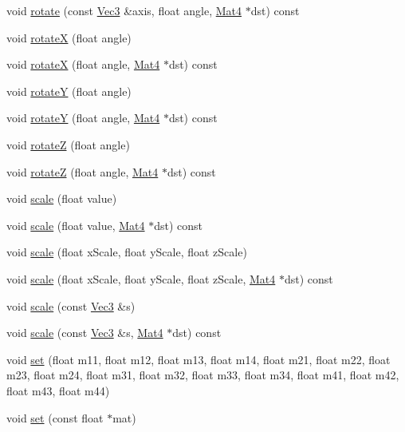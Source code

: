 \begin{DoxyCompactItemize}
\item 
void \hyperlink{classMat4_a548095c5ec16649ab859f317c5b6fec8}{rotate} (const \hyperlink{classVec3}{Vec3} \&axis, float angle, \hyperlink{classMat4}{Mat4} $\ast$dst) const
\item 
void \hyperlink{classMat4_a5e84d2bcffe8021db81c6614a88b39e5}{rotateX} (float angle)
\item 
void \hyperlink{classMat4_a8fd010ff0b011e0e2b9f97e1b83df9e5}{rotateX} (float angle, \hyperlink{classMat4}{Mat4} $\ast$dst) const
\item 
void \hyperlink{classMat4_a5c32002c4bc2d64e6933a8fe50545b51}{rotateY} (float angle)
\item 
void \hyperlink{classMat4_a0a36c4dc24d143acfb8f03d8aa1ee164}{rotateY} (float angle, \hyperlink{classMat4}{Mat4} $\ast$dst) const
\item 
void \hyperlink{classMat4_a31f8fbbe32864fef9477c4d520a4c365}{rotateZ} (float angle)
\item 
void \hyperlink{classMat4_a9320c6f0c192eed1da05f8e1dcea7a1b}{rotateZ} (float angle, \hyperlink{classMat4}{Mat4} $\ast$dst) const
\item 
void \hyperlink{classMat4_a37c910140d6378e4ef7c7bb1e2d0296d}{scale} (float value)
\item 
void \hyperlink{classMat4_a02cadab494f29e01993f8bd137ac3c10}{scale} (float value, \hyperlink{classMat4}{Mat4} $\ast$dst) const
\item 
void \hyperlink{classMat4_a8ed91e5f5fe9c9b8a7ccccb2026dd2b9}{scale} (float x\+Scale, float y\+Scale, float z\+Scale)
\item 
void \hyperlink{classMat4_af8096eb9dc784653bfacee2561b6a654}{scale} (float x\+Scale, float y\+Scale, float z\+Scale, \hyperlink{classMat4}{Mat4} $\ast$dst) const
\item 
void \hyperlink{classMat4_a680fbd52838ca085c468dc4f559f3d04}{scale} (const \hyperlink{classVec3}{Vec3} \&s)
\item 
void \hyperlink{classMat4_aca9dcebbcb554ea36fc86ac1127a3fd4}{scale} (const \hyperlink{classVec3}{Vec3} \&s, \hyperlink{classMat4}{Mat4} $\ast$dst) const
\item 
void \hyperlink{classMat4_ac89d4d819ec41144c653dd80e4ddb6c3}{set} (float m11, float m12, float m13, float m14, float m21, float m22, float m23, float m24, float m31, float m32, float m33, float m34, float m41, float m42, float m43, float m44)
\item 
void \hyperlink{classMat4_aa41cf66bbbeaf8520730a1e119576ed3}{set} (const float $\ast$mat)
\item 

\end{DoxyCompactItemize}
